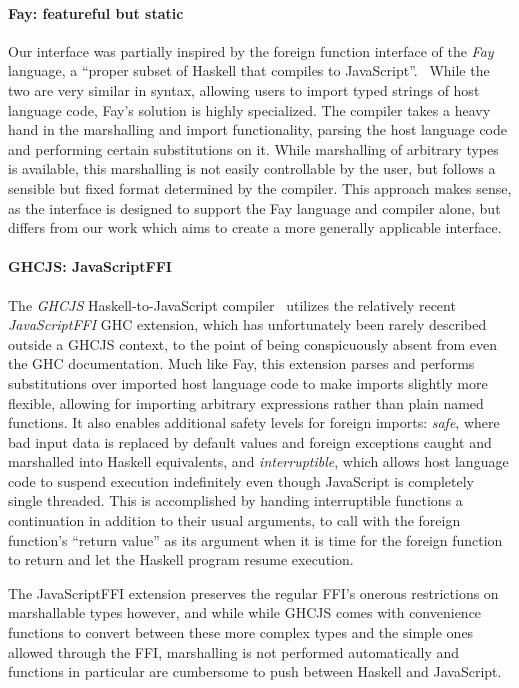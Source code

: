 \documentclass{sigplanconf}
\begin{document}
\paragraph{Fay: featureful but static}
Our interface was partially inspired by the foreign function interface of the
\emph{Fay} language,
a ``proper subset of Haskell that compiles to JavaScript''.\ \cite{fay}
While the two are very similar in syntax, allowing users to import typed
strings of host language code, Fay's solution is highly specialized.
The compiler takes a heavy hand in the marshalling and import functionality,
parsing the host language code and performing certain substitutions on it.
While marshalling of arbitrary types is available, this marshalling is not
easily controllable by the user, but follows a sensible but fixed format
determined by the compiler.
This approach makes sense, as the interface is designed to support the Fay
language and compiler alone, but differs from our work which aims to create
a more generally applicable interface.

\paragraph{GHCJS: JavaScriptFFI}
The \emph{GHCJS} Haskell-to-JavaScript compiler\ \cite{ghcjs} utilizes the
relatively recent \emph{JavaScriptFFI} GHC extension,
which has unfortunately been rarely described outside a GHCJS context, to the
point of being conspicuously absent from even the GHC documentation.
Much like Fay, this extension parses and
performs substitutions over imported host language code to make imports
slightly more flexible, allowing for importing arbitrary expressions rather
than plain named functions.
It also enables additional safety levels for foreign
imports: \emph{safe}, where bad input data is replaced by default values and
foreign exceptions caught and marshalled into Haskell equivalents,
and \emph{interruptible}, which allows host language code to suspend execution
indefinitely even though JavaScript is completely single threaded.
This is accomplished by handing interruptible functions a continuation in
addition to their usual arguments, to call with the foreign function's
``return value'' as its argument when it is time for the foreign function
to return and let the Haskell program resume execution.

The JavaScriptFFI extension preserves the regular FFI's onerous restrictions
on marshallable types however, and while while GHCJS comes with convenience
functions to convert between these more complex types and the simple ones
allowed through the FFI, marshalling is not performed automatically and
functions in particular are cumbersome to push between Haskell and JavaScript.
\end{document}
